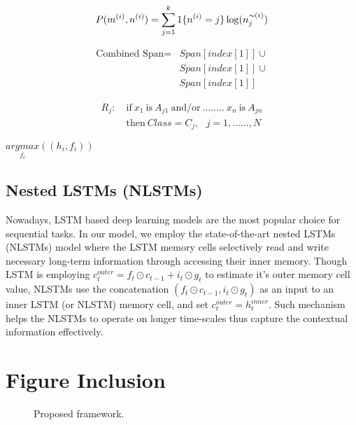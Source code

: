 \documentclass[11pt]{article}
\begin{document}
\begin{equation*}
P(m^{(i)},n^{(i)}) = \sum^{k}_{j=1} 1\{n^{(i)}=j\} \log(n_{j}^{\thicksim(i)})
\end{equation*}


\begin{equation*}
\begin{split}
\mbox{Combined Span} = &Span[index[1]] \cup \\  
                       &Span[index[1]] \cup \\
                       &Span[index[1]]
\end{split}
\end{equation*}


\begin{equation*}
\begin{split}
R_j: & \ \mbox{if}\ x_1\ \mbox{is}\ A_{j1}\ \mbox{and/or}\ ........\ x_n\ \mbox{is}\ A_{jn}\\
	 & \ \mbox{then}\ Class=C_j, \ \ \ j=1,......,N
\end{split}
\end{equation*}

$\underset{f_i}{argmax} ((h_i, f_i))$

\subsection{Nested LSTMs (NLSTMs)}
\label{ref:nestedLSTMs}
Nowadays, LSTM based deep learning models are the most popular choice for sequential tasks. In our model, we employ the state-of-the-art nested LSTMs (NLSTMs) model where the LSTM memory cells selectively read and write necessary long-term information through accessing their inner memory. Though LSTM is employing $c_{t}^{outer}={f_{t}}\odot{c_{t-1}}+{i_{t}}\odot{g_{t}}$ to estimate it's outer memory cell value, NLSTMs use the concatenation $({f_{t}}\odot{c_{t-1}},{i_{t}}\odot{g_{t}})$ as an input to an inner LSTM (or NLSTM) memory cell, and set $c_{t}^{outer}=h_{t}^{inner}$. Such mechanism helps the NLSTMs to operate on longer time-scales thus capture the contextual information effectively.


\section{Figure Inclusion}
\label{ref:figure}

\begin{figure}[!htb]
\centering
\caption{Proposed framework.}
\label{fig:overview}
\end{figure}
\end{document}
